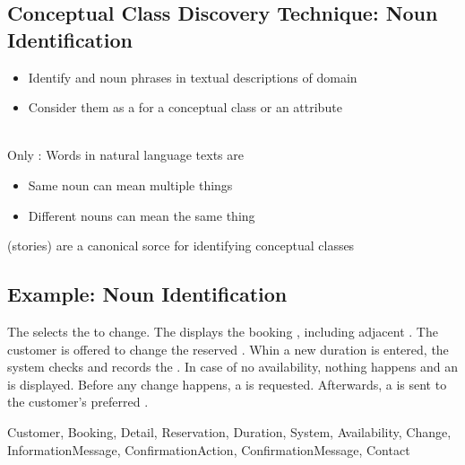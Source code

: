 \subsection{Conceptual Class Discovery Technique: Noun Identification}
\begin{defBox}[title=Workflow]
    \begin{itemize}
        \item Identify  and noun phrases in textual descriptions of domain
        \item Consider them as a  for a conceptual class or an attribute
    \end{itemize}
\end{defBox}
\\
Only : Words in natural language texts are 
\begin{itemize}
    \item Same noun can mean multiple things
    \item Different nouns can mean the same thing
\end{itemize}
\begin{defBox}
     (stories) are a canonical sorce for identifying conceptual classes
\end{defBox}

\subsection{Example: Noun Identification}
\begin{defBox}[title=Text Story: Change Existing Booking]
    The  selects the  to change. The  displays the booking , including adjacent . The customer is offered to change the reserved . Whin a new duration is entered, the system checks  and records the . In case of no availability, nothing happens and an  is displayed. Before any change happens, a  is requested. Afterwards, a  is sent to the customer's preferred .
\end{defBox}
\begin{defBox}[title=Condidate Conceptual Classes]
    Customer, Booking, Detail, Reservation, Duration, System, Availability, Change, InformationMessage, ConfirmationAction, ConfirmationMessage, Contact
\end{defBox}

